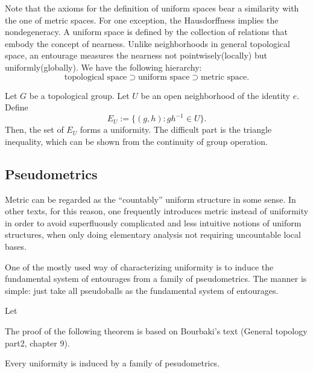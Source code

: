 Note that the axioms for the definition of uniform spaces bear a similarity with the one of metric spaces.
For one exception, the Hausdorffness implies the nondegeneracy.
A uniform space is defined by the collection of relations that embody the concept of nearness.
Unlike neighborhoods in general topological space, an entourage measures the nearness not pointwisely(locally) but uniformly(globally).
We have the following hierarchy:
\[\text{topological space} \supset \text{uniform space} \supset \text{metric space}.\]
\begin{ex}
Let $G$ be a topological group.
Let $U$ be an open neighborhood of the identity $e$.
Define
\[E_U:=\{(g,h):gh^{-1}\in U\}.\]
Then, the set of $E_U$ forms a uniformity.
The difficult part is the triangle inequality, which can be shown from the continuity of group operation.
\end{ex}




\subsection{Pseudometrics}




Metric can be regarded as the ``countably'' uniform structure in some sense. 
In other texts, for this reason, one frequently introduces metric instead of uniformity in order to avoid superfluously complicated and less intuitive notions of uniform structures, when only doing elementary analysis not requiring uncountable local bases.



One of the mostly used way of characterizing uniformity is to induce the fundamental system of entourages from a family of pseudometrics.
The manner is simple: just take all pseudoballs as the fundamental system of entourages.
\begin{defn}
Let 
\end{defn}
The proof of the following theorem is based on Bourbaki's text (General topology part2, chapter 9).

\begin{thm}
Every uniformity is induced by a family of pesudometrics.
\end{thm}
\begin{pf}

\end{pf}










